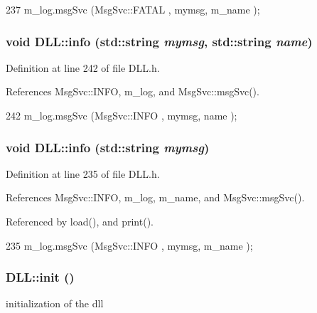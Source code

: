 \begin{DoxyCode}
237 { m_log.msgSvc (MsgSvc::FATAL   , mymsg, m_name ); }
\end{DoxyCode}
\hypertarget{classDLL_ac7c5b201c76267167f3543d524d06046}{
\subsubsection[{info}]{\setlength{\rightskip}{0pt plus 5cm}void DLL::info (std::string {\em mymsg}, \/  std::string {\em name})}}
\label{classDLL_ac7c5b201c76267167f3543d524d06046}


Definition at line 242 of file DLL.h.

References MsgSvc::INFO, m\_\-log, and MsgSvc::msgSvc().


\begin{DoxyCode}
242 { m_log.msgSvc (MsgSvc::INFO    , mymsg, name ); }
\end{DoxyCode}
\hypertarget{classDLL_a2b7ea0c85b83a1dec03e4fce13c0d5d2}{
\subsubsection[{info}]{\setlength{\rightskip}{0pt plus 5cm}void DLL::info (std::string {\em mymsg})}}
\label{classDLL_a2b7ea0c85b83a1dec03e4fce13c0d5d2}


Definition at line 235 of file DLL.h.

References MsgSvc::INFO, m\_\-log, m\_\-name, and MsgSvc::msgSvc().

Referenced by load(), and print().


\begin{DoxyCode}
235 { m_log.msgSvc (MsgSvc::INFO    , mymsg, m_name ); }
\end{DoxyCode}
\hypertarget{classDLL_ad2a4ae95995c0fa312ae31169df12d72}{
\subsubsection[{init}]{ DLL::init ()}}
\label{classDLL_ad2a4ae95995c0fa312ae31169df12d72}
initialization of the dll 

